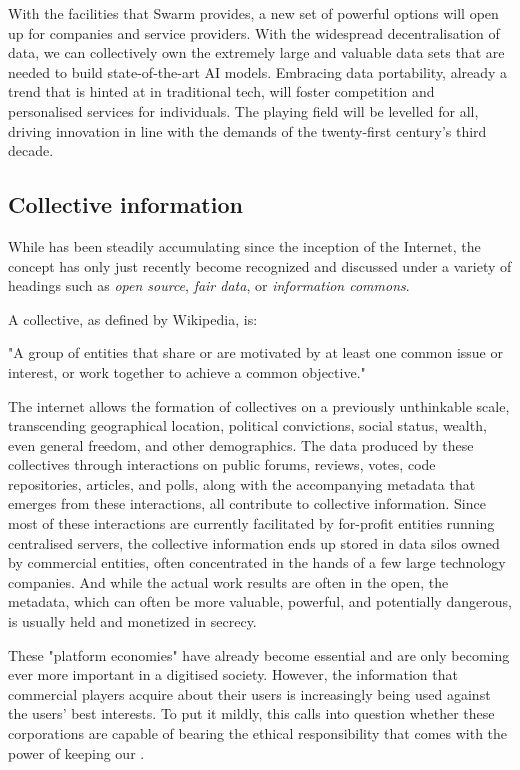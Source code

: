 With the facilities that Swarm provides, a new set of powerful options will open up for companies and service providers. With the widespread decentralisation of data, we can collectively own the extremely large and valuable data sets that are needed to build state-of-the-art AI models. Embracing data portability, already a trend that is hinted at in traditional tech, will foster competition and personalised services for individuals. The playing field will be levelled for all, driving innovation in line with the demands of the twenty-first century's third decade. 



\subsection{Collective information \statusgreen}\label{sec:collective_information}

While  has been steadily accumulating since the inception of the Internet, the concept has only just recently become recognized and discussed under a variety of headings such as \emph{open source}, \emph{fair data}, or \emph{information commons}.

A collective, as defined by Wikipedia, is:
\begin{displayquote}
"A group of entities that share or are motivated by at least one common issue or interest, or work together to achieve a common objective." 
\end{displayquote}
The internet allows the formation of collectives on a previously unthinkable scale, transcending geographical location, political convictions, social status, wealth, even general freedom, and other demographics. The data produced by these collectives through interactions on public forums, reviews, votes, code repositories, articles, and polls, along with the accompanying metadata that emerges from these interactions, all contribute to collective information. Since most of these interactions are currently facilitated by for-profit entities running centralised servers, the collective information ends up stored in data silos owned by commercial entities, often concentrated in the hands of a few large technology companies. And while the actual work results are often in the open, the metadata, which can often be more valuable, powerful, and potentially dangerous, is usually held and monetized in secrecy.

These "platform economies" have already become essential and are only becoming ever more important in a digitised society. However, the information that commercial players acquire about their users is increasingly being used against the users' best interests. To put it mildly, this calls into question whether these corporations are capable of bearing the ethical responsibility that comes with the power of keeping our .

